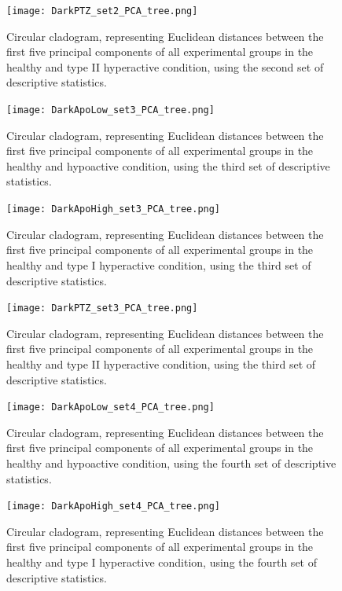 \begin{figure}[h!]
\begin{center}
\texttt{[image: DarkPTZ\_set2\_PCA\_tree.png]}
\caption{Circular cladogram, representing Euclidean distances between the first five principal components of all experimental groups in the healthy and type II hyperactive condition, using the second set of descriptive statistics.}
\end{center}
\end{figure}
\begin{figure}[h!]
\begin{center}
\texttt{[image: DarkApoLow\_set3\_PCA\_tree.png]}
\caption{Circular cladogram, representing Euclidean distances between the first five principal components of all experimental groups in the healthy and hypoactive condition, using the third set of descriptive statistics.}
\end{center}
\end{figure}
\begin{figure}[h!]
\begin{center}
\texttt{[image: DarkApoHigh\_set3\_PCA\_tree.png]}
\caption{Circular cladogram, representing Euclidean distances between the first five principal components of all experimental groups in the healthy and type I hyperactive condition, using the third set of descriptive statistics.}
\end{center}
\end{figure}
\begin{figure}[h!]
\begin{center}
\texttt{[image: DarkPTZ\_set3\_PCA\_tree.png]}
\caption{Circular cladogram, representing Euclidean distances between the first five principal components of all experimental groups in the healthy and type II hyperactive condition, using the third set of descriptive statistics.}
\end{center}
\end{figure}
\begin{figure}[h!]
\begin{center}
\texttt{[image: DarkApoLow\_set4\_PCA\_tree.png]}
\caption{Circular cladogram, representing Euclidean distances between the first five principal components of all experimental groups in the healthy and hypoactive condition, using the fourth set of descriptive statistics.}
\end{center}
\end{figure}
\begin{figure}[h!]
\begin{center}
\texttt{[image: DarkApoHigh\_set4\_PCA\_tree.png]}
\caption{Circular cladogram, representing Euclidean distances between the first five principal components of all experimental groups in the healthy and type I hyperactive condition, using the fourth set of descriptive statistics.}
\end{center}
\end{figure}

